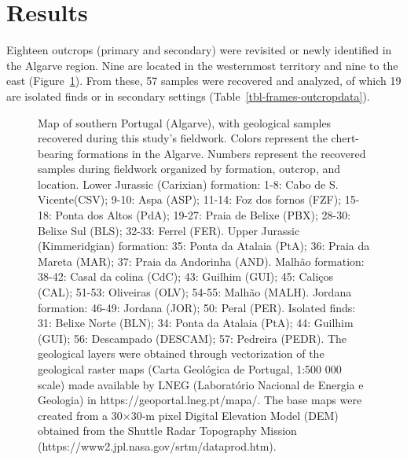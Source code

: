 \documentclass[
  a4paper,
  DIV=11,
  numbers=noendperiod]{scrreprt}
\begin{document}
\section*{Results}\label{results}


Eighteen outcrops (primary and secondary) were revisited or newly
identified in the Algarve region. Nine are located in the westernmost
territory and nine to the east (Figure~\ref{fig-frames-sourcesmap}).
From these, 57 samples were recovered and analyzed, of which 19 are
isolated finds or in secondary settings
(Table~\ref{tbl-frames-outcropdata}).

\begin{figure}


\caption{\label{fig-frames-sourcesmap}Map of southern Portugal
(Algarve), with geological samples recovered during this study's
fieldwork. Colors represent the chert-bearing formations in the Algarve.
Numbers represent the recovered samples during fieldwork organized by
formation, outcrop, and location. Lower Jurassic (Carixian) formation:
1-8: Cabo de S. Vicente(CSV); 9-10: Aspa (ASP); 11-14: Foz dos fornos
(FZF); 15-18: Ponta dos Altos (PdA); 19-27: Praia de Belixe (PBX);
28-30: Belixe Sul (BLS); 32-33: Ferrel (FER). Upper Jurassic
(Kimmeridgian) formation: 35: Ponta da Atalaia (PtA); 36: Praia da
Mareta (MAR); 37: Praia da Andorinha (AND). Malhão formation: 38-42:
Casal da colina (CdC); 43: Guilhim (GUI); 45: Caliços (CAL); 51-53:
Oliveiras (OLV); 54-55: Malhão (MALH). Jordana formation: 46-49: Jordana
(JOR); 50: Peral (PER). Isolated finds: 31: Belixe Norte (BLN); 34:
Ponta da Atalaia (PtA); 44: Guilhim (GUI); 56: Descampado (DESCAM); 57:
Pedreira (PEDR). The geological layers were obtained through
vectorization of the geological raster maps (Carta Geológica de
Portugal, 1:500 000 scale) made available by LNEG (Laboratório Nacional
de Energia e Geologia) in https://geoportal.lneg.pt/mapa/. The base maps
were created from a 30×30‐m pixel Digital Elevation Model (DEM) obtained
from the Shuttle Radar Topography Mission
(https://www2.jpl.nasa.gov/srtm/dataprod.htm).}


\end{figure}
\end{document}
